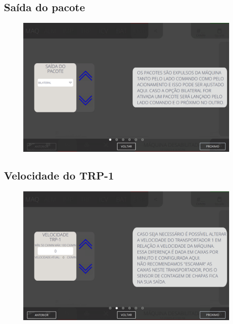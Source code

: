 \thispagestyle{fancy}
\vspace*{40 pt}
\subsection{\small Saída do pacote}
\vspace*{\fill}
\begin{figure}[h]
    \centering
    \includegraphics[width=576 px,height=360 px]{src/imagesICV/08-stacker/settings/1.png}
\end{figure}
\vspace*{\fill}

\newpage
\thispagestyle{fancy}
\vspace*{40 pt}
\subsection{\small Velocidade do TRP-1}
\vspace*{\fill}
\begin{figure}[h]
    \centering
    \includegraphics[width=576 px,height=360 px]{src/imagesICV/08-stacker/settings/2.png}
\end{figure}
\vspace*{\fill}

